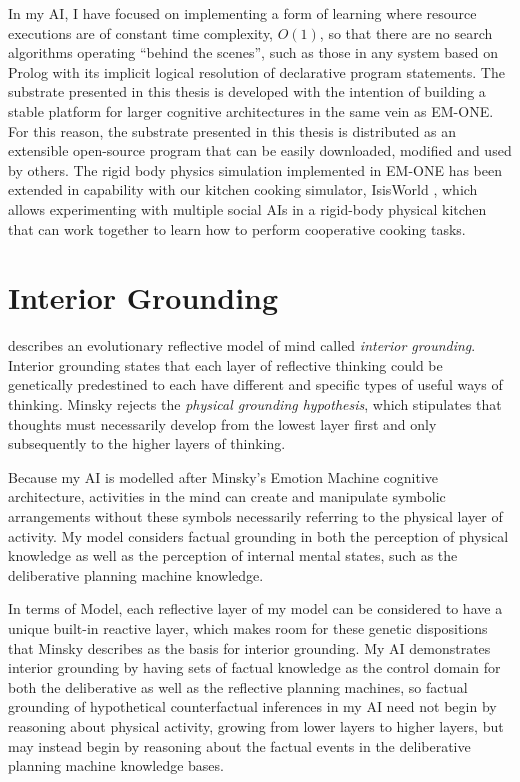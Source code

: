 In my AI, I have focused on implementing a form of learning where
resource executions are of constant time complexity, $O(1)$, so that
there are no search algorithms operating ``behind the scenes'', such
as those in any system based on Prolog with its implicit logical
resolution of declarative program statements.  The substrate presented
in this thesis is developed with the intention of building a stable
platform for larger cognitive architectures in the same vein as
EM-ONE.  For this reason, the substrate presented in this thesis is
distributed as an extensible open-source program that can be easily
downloaded, modified and used by others.  The rigid body physics
simulation implemented in EM-ONE has been extended in capability with
our kitchen cooking simulator, IsisWorld \cite[]{smith:2010}, which
allows experimenting with multiple social AIs in a rigid-body physical
kitchen that can work together to learn how to perform cooperative
cooking tasks.

\section{Interior Grounding}

\cite{minsky:2005} describes an evolutionary reflective model of mind
called \emph{interior grounding}.  Interior grounding states that each
layer of reflective thinking could be genetically predestined to each
have different and specific types of useful ways of thinking.  Minsky
rejects the \emph{physical grounding hypothesis}, which stipulates
that thoughts must necessarily develop from the lowest layer first and
only subsequently to the higher layers of thinking.

Because my AI is modelled after Minsky's Emotion Machine cognitive
architecture, activities in the mind can create and manipulate
symbolic arrangements without these symbols necessarily referring to
the physical layer of activity.  My model considers factual grounding
in both the perception of physical knowledge as well as the perception
of internal mental states, such as the deliberative planning machine
knowledge.

In terms of Model, each reflective layer of my model can
be considered to have a unique built-in reactive layer, which makes
room for these genetic dispositions that Minsky describes as the basis
for interior grounding.  My AI demonstrates interior grounding by
having sets of factual knowledge as the control domain for both the
deliberative as well as the reflective planning machines, so factual
grounding of hypothetical counterfactual inferences in my AI need not
begin by reasoning about physical activity, growing from lower layers
to higher layers, but may instead begin by reasoning about the factual
events in the deliberative planning machine knowledge bases.

